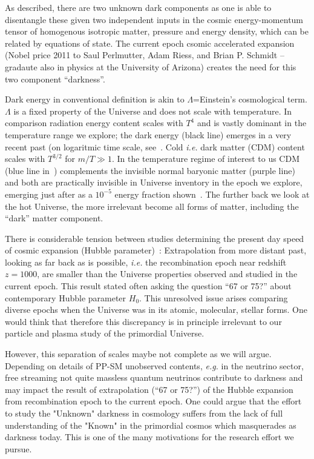 As described, there are two unknown dark components as one is able to disentangle these given two independent inputs in the cosmic energy-momentum tensor of homogenous isotropic matter, pressure and energy density, which can be related by equations of state. The current epoch csomic accelerated expansion (Nobel price 2011 to Saul Perlmutter, Adam Riess, and Brian P. Schmidt -- gradaute also in physics at the University of Arizona) creates the need for this two component ``darkness''.

Dark energy in conventional definition is akin to $\Lambda$=Einstein's cosmological term. $\Lambda$ is a fixed property of the Universe and does not scale with temperature. In comparison radiation energy content scales with $T^4$ and is vastly dominant in the temperature range we explore; the dark energy (black line) emerges in a very recent past (on logaritmic time scale, see~. Cold {\it i.e.\/} dark matter (CDM) content scales with $T^{3/2}$ for $m/T\gg 1$. In the temperature regime of interest to us CDM (blue line in~) complements the invisible normal baryonic matter (purple line) and both are practically invisible in Universe inventory in the epoch we explore, emerging just after as a $10^{-5}$ energy fraction shown~. The further back we look at the hot Universe, the more irrelevant become all forms of matter, including the ``dark'' matter component. 

There is considerable tension between studies determining the present day speed of cosmic expansion (Hubble parameter)~\cite{DiValentino:2024spr,DiValentino:2021izs}: Extrapolation from more distant past, looking as far back as is possible, {\it i.e.\/} the recombination epoch near  redshift $z=1000$, are smaller than the Universe properties observed and studied in the current epoch. This result stated often asking the question ``67 or 75?'' about contemporary Hubble parameter $H_0$. This unresolved issue arises comparing diverse epochs when the Universe was in its atomic, molecular, stellar forms. One would think that therefore this discrepancy is in principle irrelevant to our particle and plasma study of the primordial Universe. 

However, this separation of scales maybe not complete as we will argue. Depending on details of PP-SM unobserved contents, {\it e.g.\/} in the neutrino sector, free streaming not quite massless quantum neutrinos contribute to darkness and may impact the result of extrapolation (``67 or 75?'') of the Hubble expansion from recombination epoch to the current epoch. One could argue that the effort to study the "Unknown" darkness in cosmology suffers from the lack of full understanding of the "Known" in the primordial cosmos which masquerades as darkness today. This is one of the many motivations for the research effort we pursue. 

